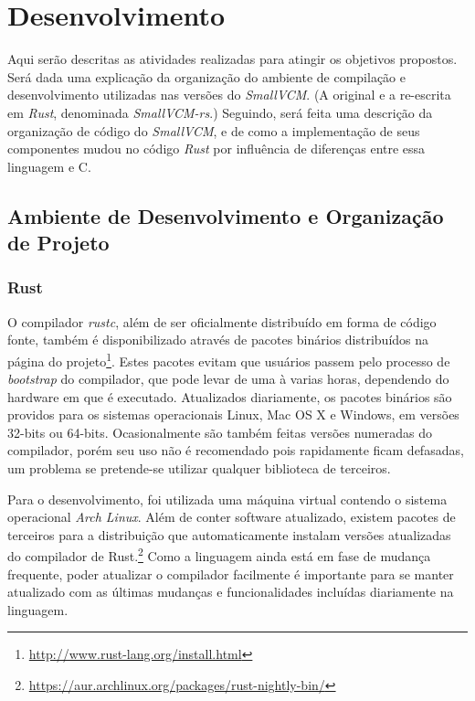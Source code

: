 \documentclass[tg]{mdtufsm}
\def\Cpp{{C\nolinebreak[4]\raisebox{.20ex}{\small\bf++}}}
\begin{document}
\chapter{Desenvolvimento}

Aqui serão descritas as atividades realizadas para atingir os objetivos propostos. Será dada uma explicação da organização do ambiente de compilação e desenvolvimento utilizadas nas versões do \emph{SmallVCM}. (A original e a re-escrita em \emph{Rust}, denominada \emph{SmallVCM-rs}.) Seguindo, será feita uma descrição da organização de código do \emph{SmallVCM}, e de como a implementação de seus componentes mudou no código \emph{Rust} por influência de diferenças entre essa linguagem e \Cpp.

\section{Ambiente de Desenvolvimento e Organização de Projeto}

\subsection{Rust}

O compilador \emph{rustc}, além de ser oficialmente distribuído em forma de código fonte, também é disponibilizado através de pacotes binários distribuídos na página do projeto\footnote{\url{http://www.rust-lang.org/install.html}}. Estes pacotes evitam que usuários passem pelo processo de \emph{bootstrap} do compilador, que pode levar de uma à varias horas, dependendo do hardware em que é executado. Atualizados diariamente, os pacotes binários são providos para os sistemas operacionais Linux, Mac OS X e Windows, em versões 32-bits ou 64-bits. Ocasionalmente são também feitas versões numeradas do compilador, porém seu uso não é recomendado pois rapidamente ficam defasadas, um problema se pretende-se utilizar qualquer biblioteca de terceiros.

Para o desenvolvimento, foi utilizada uma máquina virtual contendo o sistema operacional \emph{Arch Linux}. Além de conter software atualizado, existem pacotes de terceiros para a distribuição que automaticamente instalam versões atualizadas do compilador de Rust.\footnote{\url{https://aur.archlinux.org/packages/rust-nightly-bin/}} Como a linguagem ainda está em fase de mudança frequente, poder atualizar o compilador facilmente é importante para se manter atualizado com as últimas mudanças e funcionalidades incluídas diariamente na linguagem.
\end{document}
